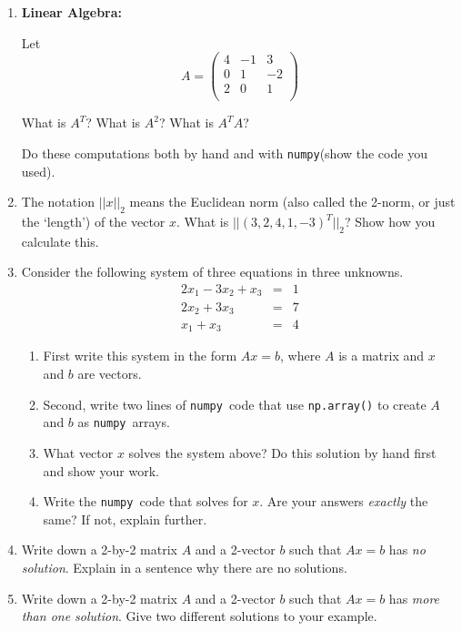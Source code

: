 \documentclass[11pt]{article}
\newcommand{\numpy}{{\tt numpy}}    %
\begin{document}
\begin{enumerate}

\item
\textbf{Linear Algebra:}

Let
$$ A = \left(
\begin{array}{ccc}
4 & -1 & 3 \\   
0 & 1 & -2 \\ 
2 & 0 & 1 \\
\end{array} 
\right)$$



What is $A^T$?  What is $A^2$?  What is $A^TA$?

Do these computations both by hand and with \numpy (show the code you used).

\item
The notation $||x||_2$ means the Euclidean norm (also called the 2-norm, or just the `length') of the vector $x$. 
What is $||(3, 2, 4, 1, -3)^T||_2$? Show how you calculate this.

\item
Consider the following system of three equations in three unknowns.
\begin{eqnarray}
 2x_1 - 3x_2 + x_3  & =  & 1 \\
 2x_2 + 3x_3  & =  & 7 \\
 x_1 + x_3  & = & 4 
\end{eqnarray}

\begin{enumerate}
    \item 
    First write this system in the form $Ax=b$, 
where $A$ is a matrix and $x$ and $b$ are vectors. 
    \item 
    Second, write two lines of \numpy\ code that use {\tt np.array()} to create $A$ and $b$ as \numpy\ arrays. 
    \item
    What vector $x$ solves the system above? Do this solution by hand first and show your work.
    \item
    Write the \numpy\ code that solves for $x$. Are your answers \textit{exactly} the same? If not, explain further.
\end{enumerate}

\newpage
\item
Write down a 2-by-2 matrix $A$ and a 2-vector $b$ such that $Ax=b$ has \textit{no solution}. Explain in a sentence why there are no solutions.

\item
Write down a 2-by-2 matrix $A$ and a 2-vector $b$ such that $Ax=b$ has \textit{more than one solution}. Give two different solutions to your example.


\end{enumerate}
\end{document}
